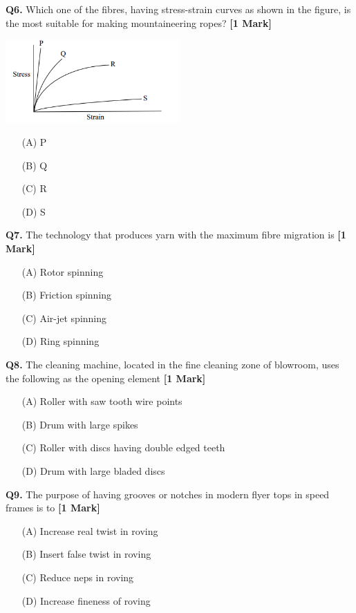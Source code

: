 \documentclass[11pt]{article}
\newcommand{\questiona}[2]{
    \noindent\textbf{Q#2.} #1 \hfill \textbf{[1 Mark]}
}
\begin{document}
\questiona{Which one of the fibres, having stress-strain curves as shown in the figure, is the most suitable for making mountaineering ropes?}{6}
\begin{center}
\includegraphics[width=0.5\textwidth]{figures/6.png}
\end{center}
\begin{enumerate}
    \item[(A)] P
    \item[(B)] Q
    \item[(C)] R
    \item[(D)] S
\end{enumerate}
\vspace{0.5cm}

\questiona{The technology that produces yarn with the maximum fibre migration is}{7}
\begin{enumerate}
    \item[(A)] Rotor spinning
    \item[(B)] Friction spinning
    \item[(C)] Air-jet spinning
    \item[(D)] Ring spinning
\end{enumerate}
\vspace{0.5cm}

\questiona{The cleaning machine, located in the fine cleaning zone of blowroom, uses the following as the opening element}{8}
\begin{enumerate}
    \item[(A)] Roller with saw tooth wire points
    \item[(B)] Drum with large spikes
    \item[(C)] Roller with discs having double edged teeth
    \item[(D)] Drum with large bladed discs
\end{enumerate}
\vspace{0.5cm}

\questiona{The purpose of having grooves or notches in modern flyer tops in speed frames is to}{9}
\begin{enumerate}
    \item[(A)] Increase real twist in roving
    \item[(B)] Insert false twist in roving
    \item[(C)] Reduce neps in roving
    \item[(D)] Increase fineness of roving
\end{enumerate}
\vspace{0.5cm}
\end{document}
